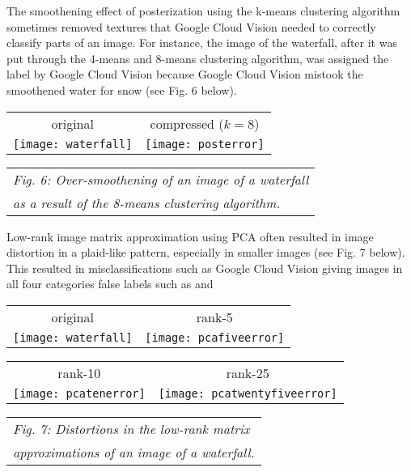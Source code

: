 \documentclass[letterpaper, 10 pt, conference]{ieeeconf}  %
\begin{document}
The smoothening effect of posterization using the k-means clustering 
algorithm sometimes removed textures that Google Cloud Vision
needed to correctly classify parts of an image. For instance,
the image of the waterfall, after it was put through the
4-means and 8-means clustering algorithm, was assigned the label 
by Google Cloud Vision because Google Cloud Vision mistook 
the smoothened water for snow (see Fig. 6 below).

\vspace*{3mm}
\begin{tabular}{c c}
	original & compressed ($k=8$) \\
	\texttt{[image: waterfall]} &
		\texttt{[image: posterror]} \\
\end{tabular}
\begin{tabular}{l}
	\hspace*{4mm} {\it Fig. 6: Over-smoothening of an image of a waterfall} \\
	\hspace*{4mm} {\it as a result of the 8-means clustering algorithm.} \\
\end{tabular}
\vspace*{3mm}

Low-rank image matrix approximation using PCA often resulted in
image distortion in a plaid-like pattern, especially in smaller
images (see Fig. 7 below). This resulted in misclassifications
such as Google Cloud Vision giving images in all four categories
false labels such as  
and 

\vspace*{3mm}
\begin{tabular}{c c}
	original & rank-5 \\
	\texttt{[image: waterfall]} &
		\texttt{[image: pcafiveerror]} \\
\end{tabular}

\begin{tabular}{c c}
	rank-10 & rank-25 \\
	\texttt{[image: pcatenerror]} &
		\texttt{[image: pcatwentyfiveerror]} \\
\end{tabular}
\begin{tabular}{l}
	\hspace*{4mm} {\it Fig. 7: Distortions in the low-rank matrix } \\
	\hspace*{4mm} {\it approximations of an image of a waterfall.} \\
\end{tabular}
\vspace*{3mm}
\end{document}
